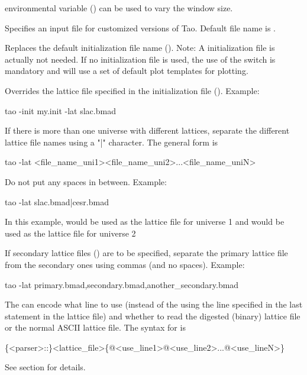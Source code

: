 \begin{description}
{{environmental variable  () can be used to vary the
window size.
%
\item[-hook_init_file] \Newline
Specifies an input file for customized versions of Tao. Default file
name is .
%
\item[-init_file <file_name>] \Newline
Replaces the default \tao initialization file name (). Note: A \tao initialization file
is actually not needed. If no \tao initialization file is used, the use of the 
switch is mandatory and \tao will use a set of default plot templates for plotting.
%
\item[-lattice_file <file_name>] \Newline
Overrides the  lattice file specified in the \tao initialization file
(). Example:
\begin{example}
  tao -init my.init -lat slac.bmad
\end{example}
If there is more than one universe with different lattices, separate the different
lattice file names using a "|" character. The general form is
\begin{example}
  tao -lat <file_name_uni1><file_name_uni2>...<file_name_uniN>
\end{example}
 Do not put any spaces in between. Example:
\begin{example}
  tao -lat slac.bmad|cesr.bmad
\end{example}
In this example,  would be used as the lattice file for universe 1 and 
would be used as the lattice file for universe 2

If secondary lattice files () are to be specified, separate the primary lattice file from
the secondary ones using commas (and no spaces). Example:
\begin{example}
  tao -lat primary.bmad,secondary.bmad,another_secondary.bmad
\end{example}

The  can encode what line to use (instead of the using the line specified in
the last  statement in the lattice file) and whether to read the digested (binary) lattice file
or the normal ASCII lattice file. The syntax for  is
\begin{example}
  \{<parser>::\}<lattice_file>\{@<use_line1>@<use_line2>...@<use_lineN>\}
\end{example}
See section  for details.

}}
\end{description}
